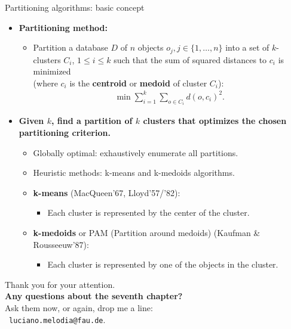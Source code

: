 \documentclass[aspectratio=169,t,xcolor=dvipsnames]{beamer}
\begin{document}
  {
    \begin{frame}{Partitioning algorithms: basic concept}
        \begin{itemize}
          \item \textbf{Partitioning method:}
          \begin{itemize}
            \item Partition a database $D$ of $n$ objects $o_j, j \in \{1, \ldots, n\}$ into a set of $k$-clusters $C_i$, $1 \leq i \leq k$ such that the sum of squared distances to $c_i$ is minimized \\ (where $c_i$ is the \textbf{\color{airforceblue}centroid} or \textbf{\color{airforceblue}medoid} of cluster $C_i$):
            \begin{align}
              \min \sum_{i=1}^{k} \sum_{o \in C_i} d(o,c_i)^2.
            \end{align}
          \end{itemize}
          \item \textbf{Given $k$, find a partition of $k$ clusters that optimizes the chosen partitioning criterion.}
          \begin{itemize}
            \item Globally optimal: exhaustively enumerate all partitions.
            \item Heuristic methods: k-means and k-medoids algorithms.
            \item \textbf{\color{airforceblue}k-means} (MacQueen'67, Lloyd'57/'82):
            \begin{itemize}
              \item Each cluster is represented by the center of the cluster.
            \end{itemize}
            \item \textbf{\color{airforceblue}k-medoids} or PAM (Partition around medoids) (Kaufman \& Rousseeuw'87):
            \begin{itemize}
              \item Each cluster is represented by one of the objects in the cluster.
            \end{itemize}
          \end{itemize}
        \end{itemize}
    \end{frame}
  }

  { %
    \begin{frame}[c]
      \begin{center}
        Thank you for your attention.\\
        {\bf Any questions about the seventh chapter?}\\[0.5cm]
        Ask them now, or again, drop me a line: \\
        \faSendO \ \texttt{luciano.melodia@fau.de}.
      \end{center}
    \end{frame}
  }
\end{document}
